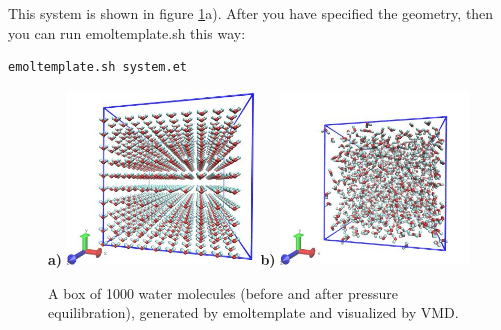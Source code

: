 \documentclass[11pt]{article}
\begin{document}
This system is shown in figure \ref{fig:spce_x_1000}a).
After you have specified the geometry, 
then you can run emoltemplate.sh this way:
\begin{verbatim}
emoltemplate.sh system.et
\end{verbatim}

\begin{figure}[htbp]
\centering
\textbf{a)}
\includegraphics[width=5cm]{waterSPCEx1000_LR.jpg}
\textbf{b)}
\includegraphics[width=5cm]{waterSPCEx1000_t=25_LR.jpg}
\caption{
\label{fig:spce_x_1000}
A box of 1000 water molecules (before and after pressure equilibration), 
generated by emoltemplate and visualized by VMD.
}
\end{figure}

\end{document}
